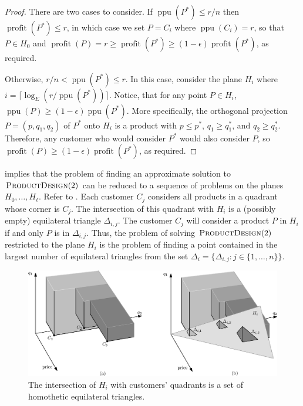 \documentclass{llncs}
\newcommand{\ppu}{\operatorname{ppu}}
\newcommand{\val}{\operatorname{profit}}
\newcommand{\eps}{\epsilon}
\begin{document}
\begin{proof}
  There are two cases to consider.  If $\ppu(P^*) \le r/n$ then $\val(P^*)
  \le r$, in which case we set $P=C_i$ where $\ppu(C_i) = r$, so that
  $P\in H_0$ and $\val(P) = r \ge \val(P^*)\ge (1-\eps)\val(P^*)$,
  as required.

  Otherwise, $r/n < \ppu(P^*) \le r$.  In this case, consider the
  plane $H_i$ where $i = \lceil\log_E (r/\ppu(P^*))\rceil$.  Notice,
  that for any point $P\in H_i$, $\ppu(P) \ge (1-\eps)\ppu(P^*)$.
  More specifically, the orthogonal projection $P=(p,q_1,q_2)$ of $P^*$
  onto $H_i$ is a product with $p\le p^*$, $q_1\ge q_1^*$, and $q_2\ge
  q_2^*$.  Therefore, any customer who would consider $P^*$ would also
  consider $P$, so $\val(P) \ge (1-\eps)\val(P^*)$, as required.
\end{proof}

 implies that the problem of finding an approximate
solution to  $\textsc{ProductDesign}(2)$ can be reduced to a sequence of
problems on the planes $H_0,\ldots,H_\ell$.  Refer to . Each
customer $C_j$ considers all products in a quadrant whose corner is $C_j$.
The intersection of this quadrant with $H_i$ is a (possibly empty)
equilateral triangle $\Delta_{i,j}$.  The customer $C_j$ will consider
a product $P$ in $H_i$ if and only $P$ is in $\Delta_{i,j}$.  Thus,
the problem of solving $\textsc{ProductDesign}(2)$ restricted to the
plane $H_i$ is the problem of finding a point contained in the largest
number of equilateral triangles from the set $\Delta_i=\{\Delta_{i,j}:
j\in\{1,\ldots,n\}\}$.

\begin{figure}
  \begin{center}
    \includegraphics[width=\textwidth]{plane}
  \end{center}
  \caption{The intersection of $H_i$ with customers' quadrants is a
          set of homothetic equilateral triangles.}
\end{figure}
\end{document}
